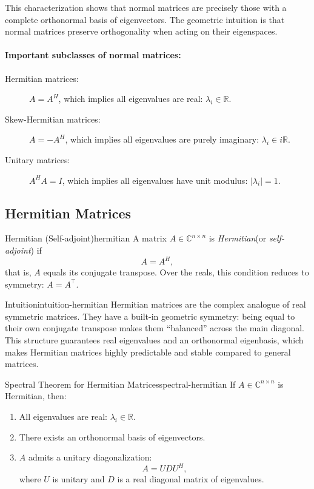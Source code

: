 This characterization shows that normal matrices are precisely those with a complete orthonormal basis of eigenvectors. The geometric intuition is that normal matrices preserve orthogonality when acting on their eigenspaces.

\paragraph{Important subclasses of normal matrices:}
\begin{description}
    \item[Hermitian matrices:] $A = A^H$, which implies all eigenvalues are real: $\lambda_i \in \mathbb{R}$.
    \item[Skew-Hermitian matrices:] $A = -A^H$, which implies all eigenvalues are purely imaginary: $\lambda_i \in i\mathbb{R}$.
    \item[Unitary matrices:] $A^H A = I$, which implies all eigenvalues have unit modulus: $|\lambda_i| = 1$.
\end{description}

\subsection{Hermitian Matrices}

\begin{definition}{Hermitian (Self-adjoint)}{hermitian}
    A matrix $A \in \mathbb{C}^{n \times n}$ is \emph{Hermitian}(or \emph{self-adjoint}) if
    \[
        A = A^H,
    \]
    that is, $A$ equals its conjugate transpose. Over the reals, this condition reduces to symmetry: $A = A^\top$.
\end{definition}

\begin{remark}{Intuition}{intuition-hermitian}
    Hermitian matrices are the complex analogue of real symmetric matrices.
    They have a built-in geometric symmetry: being equal to their own conjugate transpose makes them “balanced” across the main diagonal.
    This structure guarantees real eigenvalues and an orthonormal eigenbasis, which makes Hermitian matrices highly predictable and stable compared to general matrices.
\end{remark}

\begin{theorem}{Spectral Theorem for Hermitian Matrices}{spectral-hermitian}
    If $A \in \mathbb{C}^{n \times n}$ is Hermitian, then:
    \begin{enumerate}
        \item All eigenvalues are real: $\lambda_i \in \mathbb{R}$.
        \item There exists an orthonormal basis of eigenvectors.
        \item $A$ admits a unitary diagonalization:
              \[
                  A = U D U^H,
              \]
              where $U$ is unitary and $D$ is a real diagonal matrix of eigenvalues.
    \end{enumerate}
\end{theorem}

